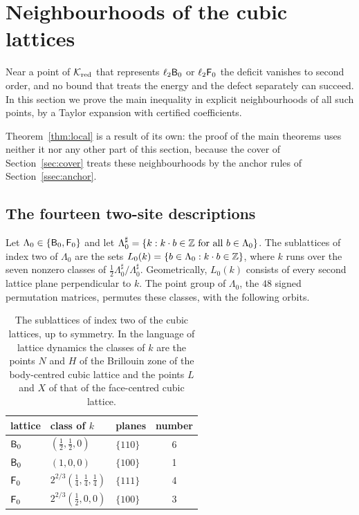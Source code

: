 \section{Neighbourhoods of the cubic lattices}\label{sec:local}

Near a point of $\mathcal K_{\mathrm{red}}$ that represents $\ell_2\mathsf B_0$ or $\ell_2\mathsf F_0$ the deficit vanishes to second order, and no bound that
treats the energy and the defect separately can succeed. In this section we prove the main inequality in explicit neighbourhoods of
all such points, by a Taylor expansion with certified coefficients.

Theorem~\ref{thm:local} is a result of its own: the proof of the main theorems uses neither it nor any other part of this section,
because the cover of Section~\ref{sec:cover} treats these neighbourhoods by the anchor rules of Section~\ref{ssec:anchor}.

\subsection{The fourteen two-site descriptions}\label{ssec:fourteen}

Let $\Lambda_0\in\{\mathsf B_0,\mathsf F_0\}$ and let $\Lambda_0^\sharp=\{k:k\cdot b\in\mathbb Z\text{ for all }b\in\Lambda_0\}$. The sublattices of index two
of $\Lambda_0$ are the sets $L_0(k)=\{b\in\Lambda_0:k\cdot b\in\mathbb Z\}$, where $k$ runs over the seven nonzero classes of
$\frac12\Lambda_0^\sharp/\Lambda_0^\sharp$. Geometrically, $L_0(k)$ consists of every second lattice plane perpendicular to $k$. The
point group of $\Lambda_0$, the $48$ signed permutation matrices, permutes these classes, with the following orbits.

\begin{table}[h]
\begin{tabular}{lllc}
\toprule
lattice & class of $k$ & planes & number\\
\midrule
$\mathsf B_0$ & $(\frac12,\frac12,0)$ & $\{110\}$ & 6\\
$\mathsf B_0$ & $(1,0,0)$ & $\{100\}$ & 1\\
$\mathsf F_0$ & $2^{2/3}(\frac14,\frac14,\frac14)$ & $\{111\}$ & 4\\
$\mathsf F_0$ & $2^{2/3}(\frac12,0,0)$ & $\{100\}$ & 3\\
\bottomrule
\end{tabular}
\caption{The sublattices of index two of the cubic lattices, up to symmetry. In the language of lattice dynamics the classes of $k$ are
the points $N$ and $H$ of the Brillouin zone of the body-centred cubic lattice and the points $L$ and $X$ of that of the face-centred
cubic lattice.}\label{tab:classes}
\end{table}

